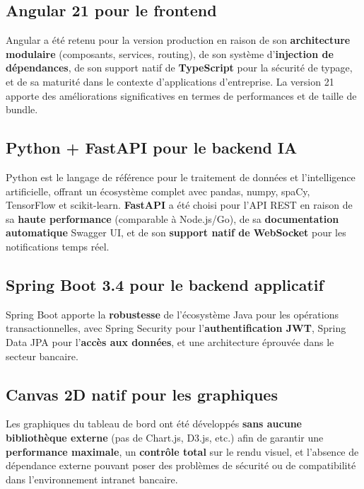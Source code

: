 \documentclass[12pt,a4paper]{report}
\begin{document}
\subsection{Angular 21 pour le frontend}

Angular a été retenu pour la version production en raison de son \textbf{architecture modulaire} (composants, services, routing), de son système d'\textbf{injection de dépendances}, de son support natif de \textbf{TypeScript} pour la sécurité de typage, et de sa maturité dans le contexte d'applications d'entreprise. La version 21 apporte des améliorations significatives en termes de performances et de taille de bundle.

\subsection{Python + FastAPI pour le backend IA}

Python est le langage de référence pour le traitement de données et l'intelligence artificielle, offrant un écosystème complet avec pandas, numpy, spaCy, TensorFlow et scikit-learn. \textbf{FastAPI} a été choisi pour l'API REST en raison de sa \textbf{haute performance} (comparable à Node.js/Go), de sa \textbf{documentation automatique} Swagger UI, et de son \textbf{support natif de WebSocket} pour les notifications temps réel.

\subsection{Spring Boot 3.4 pour le backend applicatif}

Spring Boot apporte la \textbf{robustesse} de l'écosystème Java pour les opérations transactionnelles, avec Spring Security pour l'\textbf{authentification JWT}, Spring Data JPA pour l'\textbf{accès aux données}, et une architecture éprouvée dans le secteur bancaire.

\subsection{Canvas 2D natif pour les graphiques}

Les graphiques du tableau de bord ont été développés \textbf{sans aucune bibliothèque externe} (pas de Chart.js, D3.js, etc.) afin de garantir une \textbf{performance maximale}, un \textbf{contrôle total} sur le rendu visuel, et l'absence de dépendance externe pouvant poser des problèmes de sécurité ou de compatibilité dans l'environnement intranet bancaire.
\end{document}
